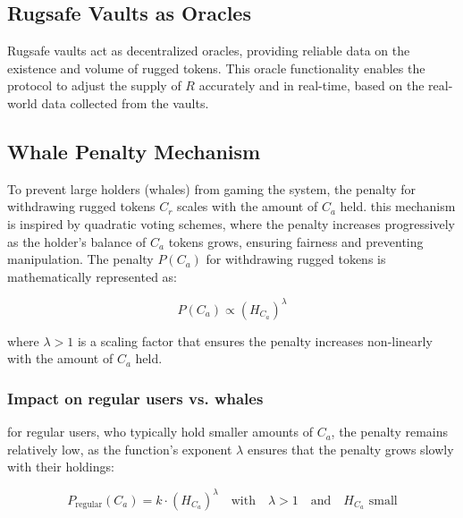 \documentclass{article}
\begin{document}
\subsection{Rugsafe Vaults as Oracles}
Rugsafe vaults act as decentralized oracles, providing reliable data on the existence and volume of rugged tokens. This oracle functionality enables the protocol to adjust the supply of $R$ accurately and in real-time, based on the real-world data collected from the vaults.

























\subsection{Whale Penalty Mechanism}
To prevent large holders (whales) from gaming the system, the penalty for withdrawing rugged tokens $C_r$ scales with the amount of $C_a$ held. this mechanism is inspired by quadratic voting schemes, where the penalty increases progressively as the holder's balance of $C_a$ tokens grows, ensuring fairness and preventing manipulation. The penalty $P(C_a)$ for withdrawing rugged tokens is mathematically represented as:

\[
P(C_a) \propto \left(H_{C_a}\right)^\lambda
\]

where $\lambda > 1$ is a scaling factor that ensures the penalty increases non-linearly with the amount of $C_a$ held.

\subsubsection{Impact on regular users vs. whales}

for regular users, who typically hold smaller amounts of $C_a$, the penalty remains relatively low, as the function’s exponent $\lambda$ ensures that the penalty grows slowly with their holdings:

\[
P_{\text{regular}}(C_a) = k \cdot \left(H_{C_a}\right)^\lambda \quad \text{with} \quad \lambda > 1 \quad \text{and} \quad H_{C_a} \text{ small}
\]
\end{document}

